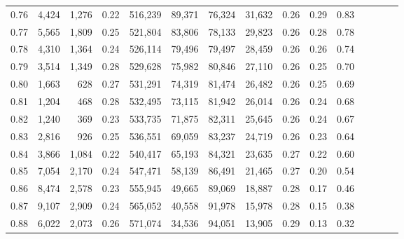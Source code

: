 \begin{tabular}{rrrcrrrrrrrrrrr}
0.76 &   4,424 &  1,276 &                                       0.22 &  516,239 &   89,371 &   76,324 &   31,632 &  0.26 &  0.29 &                         0.83 \\
0.77 &   5,565 &  1,809 &                                       0.25 &  521,804 &   83,806 &   78,133 &   29,823 &  0.26 &  0.28 &                         0.78 \\
0.78 &   4,310 &  1,364 &                                       0.24 &  526,114 &   79,496 &   79,497 &   28,459 &  0.26 &  0.26 &                         0.74 \\
0.79 &   3,514 &  1,349 &                                       0.28 &  529,628 &   75,982 &   80,846 &   27,110 &  0.26 &  0.25 &                         0.70 \\
0.80 &   1,663 &    628 &                                       0.27 &  531,291 &   74,319 &   81,474 &   26,482 &  0.26 &  0.25 &                         0.69 \\
0.81 &   1,204 &    468 &                                       0.28 &  532,495 &   73,115 &   81,942 &   26,014 &  0.26 &  0.24 &                         0.68 \\
0.82 &   1,240 &    369 &                                       0.23 &  533,735 &   71,875 &   82,311 &   25,645 &  0.26 &  0.24 &                         0.67 \\
0.83 &   2,816 &    926 &                                       0.25 &  536,551 &   69,059 &   83,237 &   24,719 &  0.26 &  0.23 &                         0.64 \\
0.84 &   3,866 &  1,084 &                                       0.22 &  540,417 &   65,193 &   84,321 &   23,635 &  0.27 &  0.22 &                         0.60 \\
0.85 &   7,054 &  2,170 &                                       0.24 &  547,471 &   58,139 &   86,491 &   21,465 &  0.27 &  0.20 &                         0.54 \\
0.86 &   8,474 &  2,578 &                                       0.23 &  555,945 &   49,665 &   89,069 &   18,887 &  0.28 &  0.17 &                         0.46 \\
0.87 &   9,107 &  2,909 &                                       0.24 &  565,052 &   40,558 &   91,978 &   15,978 &  0.28 &  0.15 &                         0.38 \\
0.88 &   6,022 &  2,073 &                                       0.26 &  571,074 &   34,536 &   94,051 &   13,905 &  0.29 &  0.13 &                         0.32 \\

\end{tabular}
